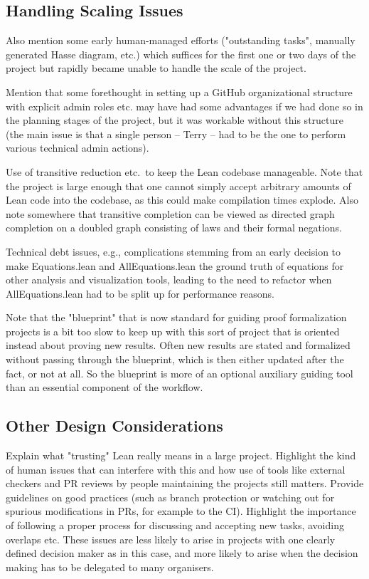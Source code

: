 \subsection{Handling Scaling Issues}

Also mention some early human-managed efforts ("outstanding tasks", manually generated Hasse diagram, etc.) which suffices for the first one or two days of the project but rapidly became unable to handle the scale of the project.

Mention that some forethought in setting up a GitHub organizational structure with explicit admin roles etc. may have had some advantages if we had done so in the planning stages of the project, but it was workable without this structure (the main issue is that a single person -- Terry -- had to be the one to perform various technical admin actions).

Use of transitive reduction etc.\ to keep the Lean codebase manageable. Note that the project is large enough that one cannot simply accept arbitrary amounts of Lean code into the codebase, as this could make compilation times explode. Also note somewhere that transitive completion can be viewed as directed graph completion on a doubled graph consisting of laws and their formal negations.

Technical debt issues, e.g., complications stemming from an early decision to make Equations.lean and AllEquations.lean the ground truth of equations for other analysis and visualization tools, leading to the need to refactor when AllEquations.lean had to be split up for performance reasons.

Note that the "blueprint" that is now standard for guiding proof formalization projects is a bit too slow to keep up with this sort of project that is oriented instead about proving new results. Often new results are stated and formalized without passing through the blueprint, which is then either updated after the fact, or not at all. So the blueprint is more of an optional auxiliary guiding tool than an essential component of the workflow.

\subsection{Other Design Considerations}

Explain what "trusting" Lean really means in a large project. Highlight the kind of human issues that can interfere with this and how use of tools like external checkers and PR reviews by people maintaining the projects still matters. Provide guidelines on good practices (such as branch protection or watching out for spurious modifications in PRs, for example to the CI). Highlight the importance of following a proper process for discussing and accepting new tasks, avoiding overlaps etc. These issues are less likely to arise in projects with one clearly defined decision maker as in this case, and more likely to arise when the decision making has to be delegated to many organisers.

